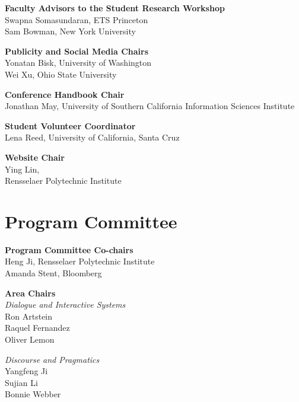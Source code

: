 {\bf Faculty Advisors to the Student Research Workshop} \\
Swapna Somasundaran, ETS Princeton\\
Sam Bowman, New York University

{\bf Publicity and Social Media Chairs} \\
Yonatan Bisk, University of Washington \\
Wei Xu, Ohio State University

{\bf Conference Handbook Chair} \\
Jonathan May, University of Southern California Information Sciences Institute

{\bf Student Volunteer Coordinator} \\
Lena Reed, University of California, Santa Cruz


{\bf Website Chair} \\
Ying Lin, \\Rensselaer Polytechnic Institute



\clearpage
\section{Program Committee}
\setlength{\parindent}{0pt}

\vspace*{0.5cm}

{\bf Program Committee Co-chairs} \\
Heng Ji, Rensselaer Polytechnic Institute\\
Amanda Stent, Bloomberg

{\bf Area Chairs} \\
\emph{Dialogue and Interactive Systems} \\
\hspace*{0.2in} Ron Artstein \\
\hspace*{0.2in} Raquel Fernandez \\
\hspace*{0.2in} Oliver Lemon

\emph{Discourse and Pragmatics} \\
\hspace*{0.2in} Yangfeng Ji \\
\hspace*{0.2in} Sujian Li \\
\hspace*{0.2in} Bonnie Webber
 
